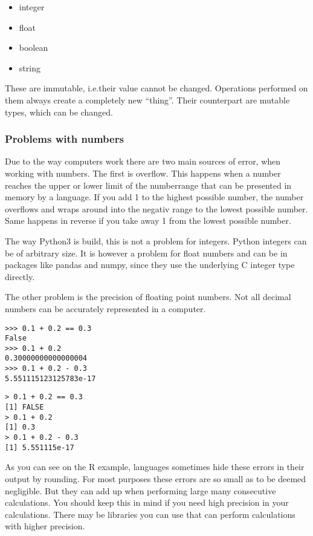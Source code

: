 \documentclass{article}
\begin{document}
\begin{itemize}
    \item integer
    \item float
    \item boolean
    \item string
\end{itemize}

These are immutable, i.e.\@ their value cannot be changed.
Operations performed on them always create a completely new ``thing''.
Their counterpart are mutable types, which can be changed.

\subsubsection{Problems with numbers}

Due to the way computers work there are two main sources of error, when working
with numbers.
The first is overflow.
This happens when a number reaches the upper or lower limit of the numberrange
that can be presented in memory by a language.
If you add 1 to the highest possible number, the number overflows and wraps around
into the negativ range to the lowest possible number.
Same happens in reverse if you take away 1 from the lowest possible number.

The way Python3 is build, this is not a problem for integers.
Python integers can be of arbitrary size.
It is however a problem for float numbers and can be in packages like pandas
and numpy, since they use the underlying C integer type directly.

The other problem is the precision of floating point numbers.
Not all decimal numbers can be accurately represented in a computer.


\begin{lstlisting}[title={Precision error in Python}]
>>> 0.1 + 0.2 == 0.3
False
>>> 0.1 + 0.2
0.30000000000000004
>>> 0.1 + 0.2 - 0.3
5.551115123125783e-17
\end{lstlisting}

\begin{lstlisting}[title={Precision error in R}]
> 0.1 + 0.2 == 0.3
[1] FALSE
> 0.1 + 0.2
[1] 0.3
> 0.1 + 0.2 - 0.3
[1] 5.551115e-17
\end{lstlisting}

As you can see on the R example, languages sometimes hide these errors in their
output by rounding.
For most purposes these errors are so small as to be deemed negligible.
But they can add up when performing large many consecutive calculations.
You should keep this in mind if you need high precision in your calculations.
There may be libraries you can use that can perform calculations with higher
precision.
\end{document}
